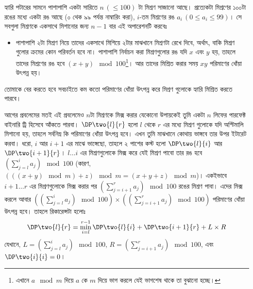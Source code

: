 \begin{example}
  হ্যারি পটারের সামনে পাশাপাশি একটা সারিতে $n \, (\le 100)$ টা মিশ্রণ সাজানো
  আছে। প্রত্যেকটা মিশ্রণের ১০০টা রঙের মধ্যে একটা রঙ আছে (০ থেক ৯৯ পর্যন্ত
  নাম্বারিং করা), $i$-তম মিশ্রণের রঙ $a_i \, (0 \le a_i \le 99)$। সে সবগুলা
  মিশ্রণকে একসাথে মিশানোর জন্য $n-1$ বার এই অপারেশনটি করবেঃ
  \begin{itemize}
    \item পাশাপাশি ২টা মিশ্রণ নিয়ে তাদের একসাথে মিশিয়ে ২টার মাঝখানে মিশ্রণটা
    রেখে দিবে, অর্থাৎ, বাকি মিশ্রণ গুলোর ক্রমের কোন পরিবর্তন হবে না। পাশাপাশি
    নির্বাচন করা মিশ্রণগুলোর রঙ যদি $x$ এবং $y$ হয়, তাহলে তাদের মিশ্রণের রঙ
    হবে $(x+y) \mod 100$\footnote{এখানে $a \mod m$ দিয়ে $a$ কে $m$ দিয়ে ভাগ
    করলে যেই ভাগশেষ থাকে তা বুঝানো হচ্ছে।}। আর তাদের মিশ্রিত করার সময় $xy$
    পরিমাণের ধোঁয়া উৎপন্ন হয়।
  \end{itemize}
  তোমাকে বের করতে হবে সবচাইতে কম কতো পরিমাণের ধোঁয়া উৎপন্ন করে মিশ্রণ গুলোকে
  হ্যারি মিশ্রিত করতে পারবে।
\end{example}

\begin{solution}
  আগের প্রবলেমের মতই এই প্রবলেমেও $n$টা মিশ্রণকে মিক্স করার যেকোনো উপায়কেই
  তুমি একটা $n$ লিফের পারফেক্ট বাইনারি ট্রি হিসেবে আঁকতে পারবা।
  $\DP\two{l}{r}$ হলো $l$ থেকে $r$ এর মধ্যে মিশ্রণ গুলোকে যদি অপ্টিমালি
  মিশানো হয়, তাহলে সর্বনিম্ন কি পরিমাণের ধোঁয়া উৎপন্ন হবে। এখন তুমি মাঝখানে
  কোথায় ভাঙ্গবে তার উপর ইটারেট করবা। ধরো, $i$ আর $i+1$ এর মাঝে ভাঙ্গেছো,
  তাহলে ২ পাশের কস্ট হলো $\DP\two{l}{i}$ আর $\DP\two{i+1}{r}$। $l \ldots i$
  এর মিশ্রণগুলোকে মিক্স করে যেই মিশ্রণ পাবো তার রঙ হবে $\left(\sum_{j=l}^{i}
  a_j \right) \mod 100$ (কারণ, $(((x+y)\mod m) + z) \mod m = (x+y+z) \mod
  m$)। একইভাবে $i+1 \ldots r$ এর মিশ্রণগুলোকে মিক্স করার পর $\left(
  \sum_{j=i+1}^{r} a_j \right) \mod 100$ রঙের মিশ্রণ পাবা। এদের মিক্স করলে
  আবার $\left( \left(\sum_{j=l}^{i} a_j \right) \mod 100 \right) \times
  \left( \left( \sum_{j=i+1}^{r} a_j \right) \mod 100 \right)$ পরিমাণের ধোঁয়া
  উৎপন্ন হবে। তাহলে রিকারেন্সটা হলোঃ
  \[
    \DP\two{l}{r} = \min_{i=l}^{r-1} \DP\two{l}{i} + \DP\two{i+1}{r} + L
    \times R
  \]
  যেখানে, $L = \left(\sum_{j=l}^{i} a_j \right) \mod 100$, $R = \left(
  \sum_{j=i+1}^{r} a_j \right) \mod 100$, এবং $\DP\two{i}{i} = 0$।
\end{solution}


